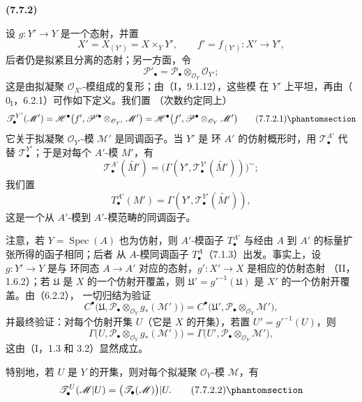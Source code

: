 \documentclass[UTF8,fontset=none,11pt,oneside,openany]{ctexbook}
\newenvironment{env}[1][]{%
  \par\medskip\noindent\textbf{(#1)}\ %
}{\par}
\let\EGAOriginalLabel\label
\renewcommand{\label}[1]{\phantomsection\EGAOriginalLabel{#1}}
\begin{document}
\begin{env}[7.7.2]
设 $g:Y'\to Y$ 是一个态射，并置
\[
  X'=X_{(Y')}=X\times_Y Y',
  \qquad
  f'=f_{(Y')}:X'\longrightarrow Y',
\]
后者仍是拟紧且分离的态射；另一方面，令
\[
  \mathscr P'_\bullet
  =\mathscr P_\bullet\otimes_{\mathscr O_Y}\mathscr O_{Y'};
\]
这是由拟凝聚 $\mathscr O_{X'}$-模组成的复形；由（I，9.1.12），这些模
在 $Y'$ 上平坦，再由（$0_{\mathrm I}$，6.2.1）可作如下定义。我们置
（次数约定同上）
\[
  \mathscr T^{Y'}_\bullet(\mathscr M')
  =\mathscr H^\bullet
    \bigl(f',\mathscr P'^\bullet\otimes_{\mathscr O_{Y'}}\mathscr M'\bigr)
  =\mathscr H^\bullet
    \bigl(f',\mathscr P^\bullet\otimes_{\mathscr O_Y}\mathscr M'\bigr)
  \tag{7.7.2.1}\label{III.7.7.2.1.fr}
\]
它关于拟凝聚 $\mathscr O_{Y'}$-模 $\mathscr M'$ 是同调函子。当 $Y'$ 是
环 $A'$ 的仿射概形时，用 $\mathscr T^{A'}_\bullet$ 代替
$\mathscr T^{Y'}_\bullet$；于是对每个 $A'$-模 $M'$，有
\[
  \mathscr T^{A'}_\bullet(\widetilde{M'})
  =\bigl(\Gamma(Y',\mathscr T^{Y'}_\bullet(\widetilde{M'}))\bigr)^\sim;
\]
我们置
\[
  T^{A'}_\bullet(M')
  =\Gamma(Y',\mathscr T^{Y'}_\bullet(\widetilde{M'})),
\]
这是一个从 $A'$-模到 $A'$-模范畴的同调函子。

注意，若 $Y=\operatorname{Spec}(A)$ 也为仿射，则 $A'$-模函子
$T^{A'}_\bullet$ 与经由 $A$ 到 $A'$ 的标量扩张所得的函子相同；后者
从 $A$-模同调函子 $T^A_\bullet$（7.1.3）出发。事实上，设 $g:Y'\to Y$ 是与
环同态 $A\to A'$ 对应的态射，$g':X'\to X$ 是相应的仿射态射
（II，1.6.2）；若 $\mathfrak U$ 是 $X$ 的一个仿射开覆盖，则
$\mathfrak U'=g'^{-1}(\mathfrak U)$ 是 $X'$ 的一个仿射开覆盖。由（6.2.2），
一切归结为验证
\[
  C^\bullet
    \bigl(\mathfrak U,
      \mathscr P_\bullet\otimes_{\mathscr O_Y}g_*(\mathscr M')\bigr)
  =C^\bullet
    \bigl(\mathfrak U',
      \mathscr P_\bullet\otimes_{\mathscr O_Y}\mathscr M'\bigr),
\]
并最终验证：对每个仿射开集 $U$（它是 $X$ 的开集），若置
$U'=g'^{-1}(U)$，则
\[
  \Gamma
    \bigl(U,\mathscr P_\bullet\otimes_{\mathscr O_Y}g_*(\mathscr M')\bigr)
  =\Gamma
    \bigl(U',\mathscr P_\bullet\otimes_{\mathscr O_Y}\mathscr M'\bigr),
\]
这由（I，1.3 和 3.2）显然成立。

特别地，若 $U$ 是 $Y$ 的开集，则对每个拟凝聚 $\mathscr O_Y$-模
$\mathscr M$，有
\[
  \mathscr T^U_\bullet(\mathscr M|U)
  =\bigl(\mathscr T_\bullet(\mathscr M)\bigr)|U.
  \tag{7.7.2.2}\label{III.7.7.2.2.fr}
\]
\end{env}
\end{document}
